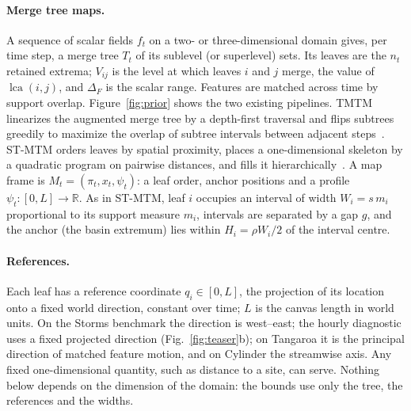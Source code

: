 \documentclass[review]{vgtc}                 %
\newcommand{\lca}{\operatorname{lca}}
\begin{document}
\paragraph{Merge tree maps.}
A sequence of scalar fields $f_t$ on a two- or three-dimensional domain gives, per time step, a merge tree $T_t$ of its sublevel (or superlevel) sets. Its leaves are the $n_t$ retained extrema; $V_{ij}$ is the level at which leaves $i$ and $j$ merge, the value of $\lca(i,j)$, and $\Delta_F$ is the scalar range. Features are matched across time by support overlap. Figure~\ref{fig:prior} shows the two existing pipelines. TMTM linearizes the augmented merge tree by a depth-first traversal and flips subtrees greedily to maximize the overlap of subtree intervals between adjacent steps~\cite{Koepp:2023:TMTM}. ST-MTM orders leaves by spatial proximity, places a one-dimensional skeleton by a quadratic program on pairwise distances, and fills it hierarchically~\cite{STMTM:2026}. A map frame is $M_t=(\pi_t,x_t,\psi_t)$: a leaf order, anchor positions and a profile $\psi_t:[0,L]\to\mathbb{R}$. As in ST-MTM, leaf $i$ occupies an interval of width $W_i=s\,m_i$ proportional to its support measure $m_i$, intervals are separated by a gap $g$, and the anchor (the basin extremum) lies within $H_i=\rho W_i/2$ of the interval centre.

\paragraph{References.} Each leaf has a reference coordinate $q_i\in[0,L]$, the projection of its location onto a fixed world direction, constant over time; $L$ is the canvas length in world units. On the Storms benchmark the direction is west--east; the hourly diagnostic uses a fixed projected direction (Fig.~\ref{fig:teaser}b); on Tangaroa it is the principal direction of matched feature motion, and on Cylinder the streamwise axis. Any fixed one-dimensional quantity, such as distance to a site, can serve. Nothing below depends on the dimension of the domain: the bounds use only the tree, the references and the widths.
\end{document}
